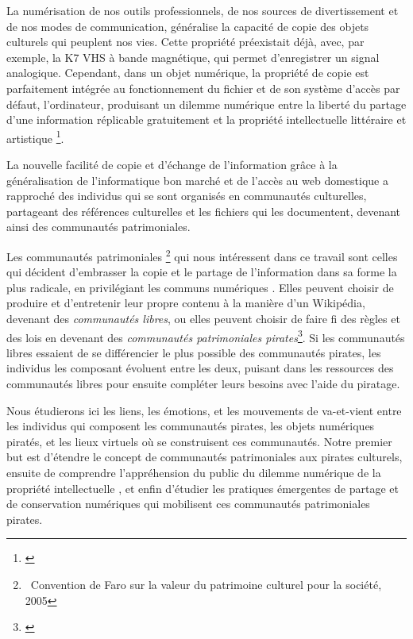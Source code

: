 La numérisation de nos outils professionnels, de nos sources de divertissement et de nos modes de communication, généralise la capacité de copie des objets culturels qui peuplent nos vies. Cette propriété préexistait déjà, avec, par exemple, la K7 VHS à bande magnétique, qui permet d'enregistrer un signal analogique. Cependant, dans un objet numérique, la propriété de copie est parfaitement intégrée au fonctionnement du fichier et de son système d'accès par défaut, l'ordinateur, produisant un dilemme numérique entre la liberté du partage d'une information réplicable gratuitement et la propriété intellectuelle littéraire et artistique \footnote{\cite{national_research_council_us_digital_2010}}.

La nouvelle facilité de copie et d'échange de l'information grâce à la généralisation de l'informatique bon marché et de l'accès au web domestique a rapproché des individus qui se sont organisés en communautés culturelles,  partageant des références culturelles et les fichiers qui les documentent, devenant ainsi des communautés patrimoniales.

Les communautés patrimoniales \footnote{~Convention de Faro sur la valeur du patrimoine culturel pour la société, 2005} qui nous intéressent dans ce travail sont celles qui décident d'embrasser la copie et le partage de l'information dans sa forme la plus radicale, en privilégiant les \guillemetleft communs numériques \guillemetright. Elles peuvent choisir de produire et d'entretenir leur propre contenu à la manière d'un Wikipédia, devenant des \textit{communautés libres}, ou elles peuvent choisir de faire fi des règles et des lois en devenant des \textit{communautés patrimoniales pirates}\footnote{\cite{bermes_lecran_2024}}. Si les communautés libres essaient de se différencier le plus possible des communautés pirates, les individus les composant évoluent entre les deux, puisant dans les ressources des communautés libres pour ensuite compléter leurs besoins avec l'aide du piratage.

Nous étudierons ici les liens, les émotions, et les mouvements de va-et-vient entre les individus qui composent les communautés pirates, les objets numériques piratés, et les lieux virtuels où se construisent ces communautés. Notre premier but est d'étendre le concept de communautés patrimoniales aux pirates culturels, ensuite de comprendre l’appréhension du public du \guillemetleft dilemme numérique de la propriété intellectuelle \guillemetright, et enfin d'étudier les pratiques émergentes de partage et de conservation numériques qui mobilisent ces communautés patrimoniales pirates.

